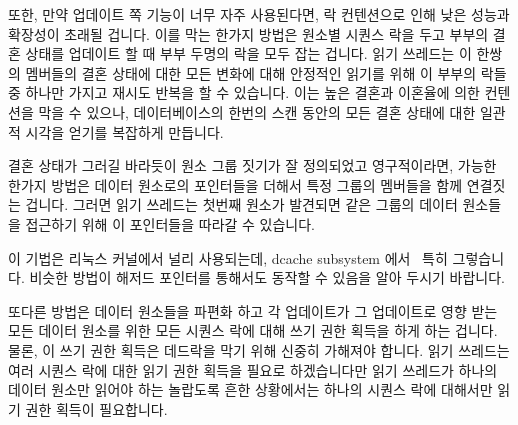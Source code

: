 \fi

또한, 만약 업데이트 쪽 기능이 너무 자주 사용된다면, 락 컨텐션으로 인해 낮은
성능과 확장성이 초래될 겁니다.
이를 막는 한가지 방법은 원소별 시퀀스 락을 두고 부부의 결혼 상태를 업데이트 할
때 부부 두명의 락을 모두 잡는 겁니다.
읽기 쓰레드는 이 한쌍의 멤버들의 결혼 상태에 대한 모든 변화에 대해 안정적인
읽기를 위해 이 부부의 락들 중 하나만 가지고 재시도 반복을 할 수 있습니다.
이는 높은 결혼과 이혼율에 의한 컨텐션을 막을 수 있으나, 데이터베이스의 한번의
스캔 동안의 모든 결혼 상태에 대한 일관적 시각을 얻기를 복잡하게 만듭니다.

결혼 상태가 그러길 바라듯이 원소 그룹 짓기가 잘 정의되었고 영구적이라면, 가능한
한가지 방법은 데이터 원소로의 포인터들을 더해서 특정 그룹의 멤버들을 함께
연결짓는 겁니다.
그러면 읽기 쓰레드는 첫번째 원소가 발견되면 같은 그룹의 데이터 원소들을
접근하기 위해 이 포인터들을 따라갈 수 있습니다.

이 기법은 리눅스 커널에서 널리 사용되는데, dcache subsystem
에서~\cite{NeilBrown2015RCUwalk} 특히 그렇습니다.
비슷한 방법이 해저드 포인터를 통해서도 동작할 수 있음을 알아 두시기 바랍니다.

\iffalse

In addition, if the update-side primitives are used too frequently,
poor performance and scalability will result due to lock contention.
One way to avoid this is to maintain a per-element sequence lock,
and to hold both spouses' locks when updating their marital status.
Readers can do their retry looping on either of the spouses' locks
to gain a stable view of any change in marital status involving both
members of the pair.
This avoids contention due to high marriage and divorce rates, but
complicates gaining a stable view of all marital statuses during a
single scan of the database.

If the element groupings are well-defined and persistent, which marital
status is hoped to be,
then one approach is to add pointers to the data elements to link
together the members of a given group.
Readers can then traverse these pointers to access all the data elements
in the same group as the first one located.

This technique is used heavily in the Linux kernel, perhaps most
notably in the dcache subsystem~\cite{NeilBrown2015RCUwalk}.
Note that it is likely that similar schemes also work with hazard
pointers.

\fi

또다른 방법은 데이터 원소들을 파편화 하고 각 업데이트가 그 업데이트로 영향 받는
모든 데이터 원소를 위한 모든 시퀀스 락에 대해 쓰기 권한 획득을 하게 하는
겁니다.
물론, 이 쓰기 권한 획득은 데드락을 막기 위해 신중히 가해져야 합니다.
읽기 쓰레드는 여러 시퀀스 락에 대한 읽기 권한 획득을 필요로 하겠습니다만 읽기
쓰레드가 하나의 데이터 원소만 읽어야 하는 놀랍도록 흔한 상황에서는 하나의
시퀀스 락에 대해서만 읽기 권한 획득이 필요합니다.

